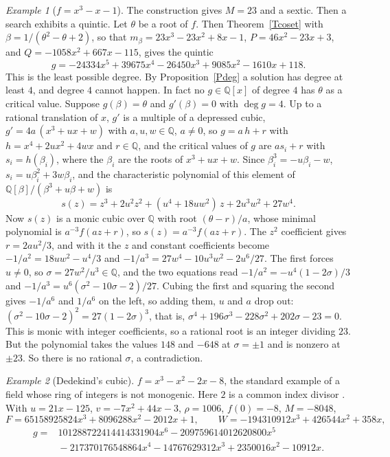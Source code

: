\documentclass[10pt]{article}
\newcommand\Q{\mathbb{Q}}
\newcommand\1{\mathbb{1}}
\theoremstyle{plain}
\theoremstyle{remark}
\newtheorem{example}{Example}
\theoremstyle{plain}
\begin{document}
\begin{example}[$f = x^{3}-x-1$]
  The construction gives $M = 23$ and a sextic. Then a search exhibits a
  quintic. Let $\theta$ be a root of $f$. Then Theorem~\ref{Tcoset}
  with $\beta = 1/(\theta^{2} - \theta + 2)$, so that
  $m_{\beta} = 23x^{3} - 23x^{2} + 8x - 1$, $P = 46x^{2} - 23x + 3$, and
  $Q = -1058x^{2} + 667x - 115$, gives the quintic
  \[
    g = -24334x^{5} + 39675x^{4} - 26450x^{3} + 9085x^{2} - 1610x + 118 .
  \]
  This is the least possible degree. By Proposition~\ref{Pdeg} a solution
  has degree at least $4$, and degree $4$ cannot happen. In fact no
  $g \in \Q[x]$ of degree $4$ has $\theta$ as a critical value. Suppose
  $g(\beta) = \theta$ and $g'(\beta) = 0$ with $\deg g = 4$. Up to a rational
  translation of $x$, $g'$ is a multiple of a depressed cubic,
  $g' = 4a\,(x^{3} + ux + w)$ with $a, u, w \in \Q$, $a \neq 0$, so
  $g = a\,h + r$ with $h = x^{4} + 2ux^{2} + 4wx$ and $r \in \Q$, and the
  critical values of $g$ are $a s_{i} + r$ with $s_{i} = h(\beta_{i})$, where
  the $\beta_{i}$ are the roots of $x^{3} + ux + w$. Since
  $\beta_{i}^{3} = -u\beta_{i} - w$, $s_{i} = u\beta_{i}^{2} + 3w\beta_{i}$,
  and the characteristic polynomial of this element of
  $\Q[\beta]/(\beta^{3} + u\beta + w)$ is
  \[
    s(z) = z^{3} + 2u^{2}z^{2} + (u^{4} + 18uw^{2})\,z + 2u^{3}w^{2} + 27w^{4} .
  \]
  Now $s(z)$ is a monic cubic over $\Q$ with root $(\theta - r)/a$, whose
  minimal polynomial is $a^{-3}f(az + r)$, so $s(z) = a^{-3}f(az + r)$. The
  $z^{2}$ coefficient gives $r = 2au^{2}/3$, and with it the $z$ and constant
  coefficients become $-1/a^{2} = 18uw^{2} - u^{4}/3$ and
  $-1/a^{3} = 27w^{4} - 10u^{3}w^{2} - 2u^{6}/27$. The first forces
  $u \neq 0$, so $\sigma = 27w^{2}/u^{3} \in \Q$, and the two equations read
  $-1/a^{2} = -u^{4}(1 - 2\sigma)/3$ and
  $-1/a^{3} = u^{6}(\sigma^{2} - 10\sigma - 2)/27$. Cubing the first and
  squaring the second gives $-1/a^{6}$ and $1/a^{6}$ on the left, so adding
  them, $u$ and $a$ drop out:
  $(\sigma^{2} - 10\sigma - 2)^{2} = 27(1 - 2\sigma)^{3}$, that is,
  $\sigma^{4} + 196\sigma^{3} - 228\sigma^{2} + 202\sigma - 23 = 0$. This is
  monic with integer coefficients, so a rational root is an integer dividing
  $23$. But the polynomial takes the values $148$ and $-648$ at
  $\sigma = \pm 1$ and is nonzero at $\pm 23$. So there is no rational
  $\sigma$, a contradiction.
\end{example}

\begin{example}[Dedekind's cubic]\label{Ex85}
  $f = x^{3} - x^{2} - 2x - 8$, the standard example of a field whose ring of
  integers is not monogenic. Here $2$ is a common index divisor
  \cite{dedekind1878}. With $u = 21x - 125$, $v = -7x^{2} + 44x - 3$,
  $\rho = 1006$, $f(0) = -8$, $M = -8048$,
  \[
    F = 65158925824x^{3} + 8096288x^{2} - 2012x + 1, \qquad
    W = -194310912x^{3} + 426544x^{2} + 358x,
  \]
  \[
    \begin{aligned}
      g = {}& 101288722414414331904x^{6} - 209759614012620800x^{5} \\
            & {} - 217370176548864x^{4} - 14767629312x^{3}
                 + 2350016x^{2} - 10912x .
    \end{aligned}
  \]
\end{example}
\end{document}
